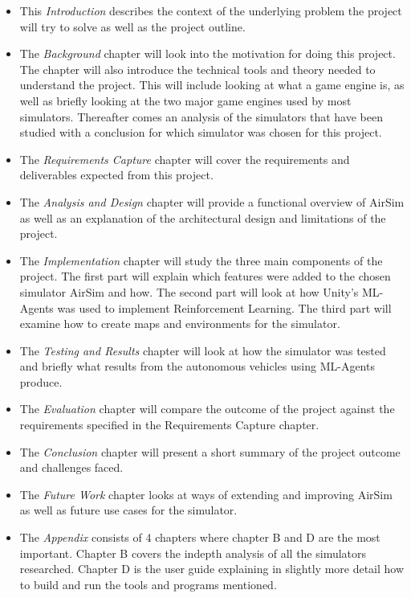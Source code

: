 \begin{itemize}
    \item This \emph{Introduction} describes the context of the underlying problem the project will try to solve as well as the project outline.
\item The \emph{Background} chapter will look into the motivation for doing this project.  The chapter will also introduce the technical tools and theory needed to understand the project. This will include looking at what a game engine is, as well as briefly looking at the two major game engines used by most simulators. Thereafter comes an analysis of the simulators that have been studied with a conclusion for which simulator was chosen for this project.
\item The \emph{Requirements Capture} chapter will cover the requirements and deliverables expected from this project. 
\item The \emph{Analysis and Design} chapter will provide a functional overview of AirSim as well as an explanation of the architectural design and limitations of the project. 
\item The \emph{Implementation} chapter will study the three main components of the project. The first part will explain which features were added to the chosen simulator AirSim and how. The second part will look at how Unity's ML-Agents was used to implement Reinforcement Learning. The third part will examine how to create maps and environments for the simulator. 
\item The \emph{Testing and Results} chapter will look at how the simulator was tested and briefly what results from the autonomous vehicles using ML-Agents produce. 
\item The \emph{Evaluation} chapter will compare the outcome of the project against the requirements specified in the Requirements Capture chapter. 
\item The \emph{Conclusion} chapter will present a short summary of the project outcome and challenges faced. 
\item The \emph{Future Work} chapter looks at ways of extending and improving AirSim as well as future use cases for the simulator. 
\item The \emph{Appendix} consists of 4 chapters where chapter B and D are the most important. Chapter B covers the indepth analysis of all the simulators researched. Chapter D is the user guide explaining in slightly more detail how to build and run the tools and programs mentioned. 
\end{itemize}


